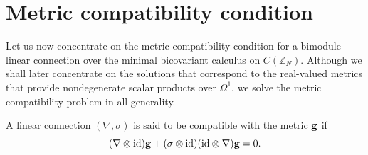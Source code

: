 \documentclass[pdftex]{sigma}
\numberwithin{equation}{section}
\newcommand{\Z}{\mathbb{Z}}
\begin{document}
\section{Metric compatibility condition}
Let us now concentrate on the metric compatibility condition for a bimodule linear connection over
the minimal bicovariant calculus on $C(\Z_N)$. Although we shall later concentrate on the solutions that correspond to the real-valued metrics that provide nondegenerate scalar products over $\Omega^1$, we solve the metric compatibility
problem in all generality.

\begin{Definition}
A linear connection $(\nabla,\sigma)$ is said to be compatible with the metric ${\bf g}$ if
\begin{equation*}
(\nabla\otimes\mathrm{id}){\bf g}+(\sigma\otimes\mathrm{id})(\mathrm{id}\otimes\nabla){\bf g}=0.
\end{equation*}
\end{Definition}
\end{document}
